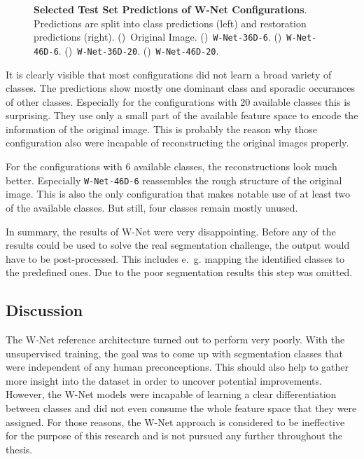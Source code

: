 \begin{figure}[h]
    \caption[Selected Test Set Predictions of W-Net Configurations]
    {\textbf{Selected Test Set Predictions of W-Net Configurations}. Predictions are split into class predictions (left) and restoration predictions (right).
    ()~Original Image.
    ()~\texttt{W-Net-36D-6}.
    ()~\texttt{W-Net-46D-6}.
    ()~\texttt{W-Net-36D-20}.
    ()~\texttt{W-Net-46D-20}.}
    \label{fig:wnet_prediction_images}
\end{figure}

It is clearly visible that most configurations did not learn a broad variety of classes. The predictions show mostly one dominant class and sporadic occurances of other classes. Especially for the configurations with 20 available classes this is surprising. They use only a small part of the available feature space to encode the information of the original image. This is probably the reason why those configuration also were incapable of reconstructing the original images properly.

For the configurations with 6 available classes, the reconstructions look much better. Especially \texttt{W-Net-46D-6} reassembles the rough structure of the original image. This is also the only configuration that makes notable use of at least two of the available classes. But still, four classes remain mostly unused.

In summary, the results of W-Net were very disappointing. Before any of the results could be used to solve the real segmentation challenge, the output would have to be post-processed. This includes e.~g. mapping the identified classes to the predefined ones. Due to the poor segmentation results this step was omitted.

\subsection{Discussion}
\label{sec:segmentation_discussion}
The W-Net reference architecture turned out to perform very poorly. With the unsupervised training, the goal was to come up with segmentation classes that were independent of any human preconceptions. This should also help to gather more insight into the dataset in order to uncover potential improvements. However, the W-Net models were incapable of learning a clear differentiation between classes and did not even consume the whole feature space that they were assigned. For those reasons, the W-Net approach is considered to be ineffective for the purpose of this research and is not pursued any further throughout the thesis.

